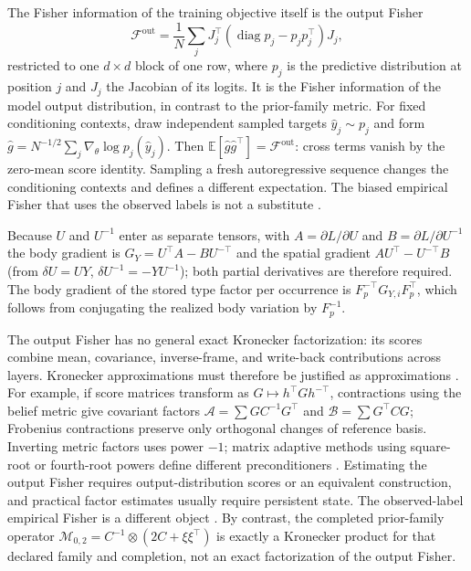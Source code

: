 \documentclass[11pt]{article}
\theoremstyle{definition}
\theoremstyle{remark}
\begin{document}
The Fisher information of the training objective itself is the output Fisher
\begin{equation}\label{frame:eq:output}
\mathcal{F}^{\mathrm{out}}=\frac1N\sum_jJ_j^\top\left(\operatorname{diag}p_j-p_jp_j^\top\right)J_j,
\end{equation}
restricted to one $d\times d$ block of one row, where $p_j$ is the predictive distribution at position $j$ and $J_j$ the Jacobian of its logits. It is the Fisher information of the model output distribution, in contrast to the prior-family metric. For fixed conditioning contexts, draw independent sampled targets $\hat y_j\sim p_j$ and form $\hat g=N^{-1/2}\sum_j\nabla_\theta\log p_j(\hat y_j)$. Then $\mathbb E[\hat g\hat g^\top]=\mathcal F^{\mathrm{out}}$: cross terms vanish by the zero-mean score identity. Sampling a fresh autoregressive sequence changes the conditioning contexts and defines a different expectation. The biased empirical Fisher that uses the observed labels is not a substitute \cite{frame:Kunstner2019}.

Because $U$ and $U^{-1}$ enter as separate tensors, with $A=\partial L/\partial U$ and $B=\partial L/\partial U^{-1}$ the body gradient is $G_Y=U^\top A-BU^{-\top}$ and the spatial gradient $AU^\top-U^{-\top}B$ (from $\delta U=UY$, $\delta U^{-1}=-YU^{-1}$); both partial derivatives are therefore required. The body gradient of the stored type factor per occurrence is $F_p^{-\top}G_{Y,i}F_p^\top$, which follows from conjugating the realized body variation by $F_p^{-1}$.

The output Fisher has no general exact Kronecker factorization: its scores combine mean, covariance, inverse-frame, and write-back contributions across layers. Kronecker approximations must therefore be justified as approximations \cite{frame:MartensGrosse2015}. For example, if score matrices transform as \(G\mapsto h^\top Gh^{-\top}\), contractions using the belief metric give covariant factors \(\mathcal A=\sum GC^{-1}G^\top\) and \(\mathcal B=\sum G^\top CG\); Frobenius contractions preserve only orthogonal changes of reference basis. Inverting metric factors uses power \(-1\); matrix adaptive methods using square-root or fourth-root powers define different preconditioners \cite{frame:GuptaKorenSinger2018}. Estimating the output Fisher requires output-distribution scores or an equivalent construction, and practical factor estimates usually require persistent state. The observed-label empirical Fisher is a different object \cite{frame:Kunstner2019}. By contrast, the completed prior-family operator \(\mathcal M_{0,2}=C^{-1}\otimes(2C+\xi\xi^\top)\) is exactly a Kronecker product for that declared family and completion, not an exact factorization of the output Fisher.
\end{document}
